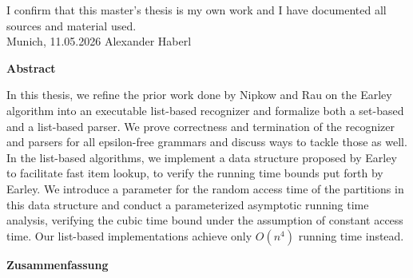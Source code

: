 \documentclass[11pt,
               a4paper,
               bibtotoc,
               idxtotoc,
               headsepline,
               footsepline,
               footexclude,
               BCOR12mm,
               DIV13,
               openany,   %
               oneside    %
               ]
               {scrbook}
\def\doctype{Master's Thesis\xspace}
\def\author{Alexander Haberl}
\def\date{11.05.2026}
\begin{document}
\addtolength{\hoffset}{\bcorcor}
\newpage


\cleardoubleemptypage

\thispagestyle{empty}
\vspace*{0.7\textheight}
\noindent
I confirm that this \MakeLowercase{\doctype} is my own work and I have documented all sources and material used.\\

\vspace{15mm}
\noindent
Munich, \date \hspace{5cm} \author
\cleardoubleemptypage


{}
\vspace*{2cm}
\begin{center}
    {\Large \bf Abstract}
\end{center}
\vspace{1cm}
In this thesis, we refine the prior work done by Nipkow and Rau on the Earley algorithm into an executable list-based recognizer and formalize both a set-based and a list-based parser.
 We prove correctness and termination of the recognizer and parsers for all epsilon-free grammars and discuss ways to tackle those as well.
In the list-based algorithms, we implement a data structure proposed by Earley to facilitate fast item lookup, to verify the running time bounds put forth by Earley.
 We introduce a parameter for the random access time of the partitions in this data structure and conduct a parameterized asymptotic running time analysis, verifying the cubic time bound under the assumption of constant access time. Our list-based implementations achieve only $O(n^4)$ running time instead.

\cleardoublepage

{}
\vspace*{2cm}
\begin{center}
    {\Large \bf Zusammenfassung}
\end{center}
\vspace{1cm}
\end{document}
